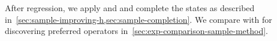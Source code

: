 \documentclass[ppgc,diss,english]{iiufrgs}
\begin{document}
%
%

After regression, we apply \sai and \sui and complete the states as described in~\cref{sec:sample-improving-h,sec:sample-completion}. We compare \bfsrs with \bfsrw for discovering preferred operators in~\cref{sec:exp-comparison-sample-method}.


%
%
\end{document}
